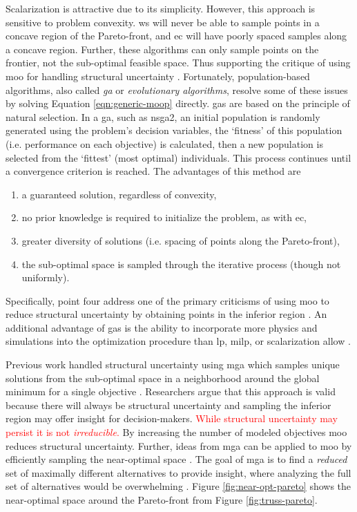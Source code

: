 Scalarization is attractive due to its simplicity. However, this approach is sensitive
to problem convexity. \ac{ws} will never be able to sample points in a concave region 
of the Pareto-front, and \ac{ec} will have poorly spaced samples along a concave 
region. Further, these algorithms can only sample points on the frontier, not the 
sub-optimal feasible space. Thus supporting the critique of using \ac{moo} for 
handling structural uncertainty \cite{decarolis_using_2011}. Fortunately, 
population-based algorithms, also called \textit{\ac{ga}} or \textit{evolutionary algorithms}, resolve some of these issues by solving Equation
\ref{eqn:generic-moop} directly. \Acp{ga} are based on the principle of natural 
selection. In a \ac{ga}, such as \ac{nsga2}, an initial population is randomly 
generated using the problem's decision variables, the `fitness' of this population 
(i.e. performance on each objective) is calculated, then a new population is selected 
from the `fittest' (most optimal) individuals. This process continues until a 
convergence criterion is reached. The advantages of this method are
\begin{enumerate}
    \item a guaranteed solution, regardless of convexity,
    \item no prior knowledge is required to initialize the problem, as with \ac{ec},
    \item greater diversity of solutions (i.e. spacing of points along the Pareto-front),
    \item the sub-optimal space is sampled through the iterative process (though not uniformly).
\end{enumerate}
Specifically, point four address one of the primary criticisms of using \ac{moo} to 
reduce structural uncertainty by obtaining points in the inferior region \cite{loughlin_genetic_2001,zechman_evolutionary_2004, zechman_evolutionary_2013}. An additional advantage of \acp{ga} is the ability to incorporate more physics and simulations into the optimization procedure than \ac{lp}, \ac{milp}, or scalarization allow \cite{loughlin_genetic_2001}. 

Previous work handled structural uncertainty using \ac{mga} which samples unique 
solutions from the sub-optimal space in a neighborhood around the global minimum for a single objective \cite{decarolis_using_2011}. Researchers argue that this approach is valid because there will always be structural uncertainty and sampling the inferior region may offer insight for decision-makers. \textcolor{red}{While structural uncertainty may persist it is not \textit{irreducible}.} By increasing the number of modeled objectives \ac{moo}
reduces structural uncertainty. Further, ideas from \ac{mga} can be applied to \ac{moo} by efficiently sampling the near-optimal space \cite{loughlin_genetic_2001, zechman_evolutionary_2004,zechman_evolutionary_2013,pajares_comparison_2021}. The goal of \ac{mga} is to find a \textit{reduced} set of maximally different alternatives to provide insight, where analyzing the full set of alternatives would
be overwhelming \cite{decarolis_using_2011, pajares_comparison_2021}. Figure \ref{fig:near-opt-pareto} shows the near-optimal space around the Pareto-front from
Figure \ref{fig:truss-pareto}.

